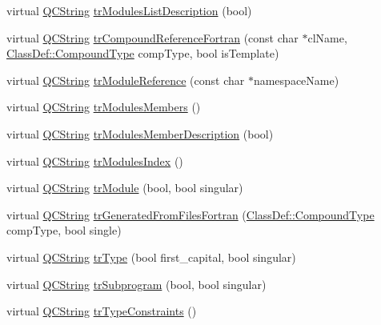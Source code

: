 \begin{DoxyCompactItemize}
virtual \mbox{\hyperlink{class_q_c_string}{Q\+C\+String}} \mbox{\hyperlink{class_translator_persian_af5c8699a8b0145943768b40867049c1d}{tr\+Modules\+List\+Description}} (bool)
\item 
virtual \mbox{\hyperlink{class_q_c_string}{Q\+C\+String}} \mbox{\hyperlink{class_translator_persian_a00ceb20bf1128a90d2e57f9cc3351181}{tr\+Compound\+Reference\+Fortran}} (const char $\ast$cl\+Name, \mbox{\hyperlink{class_class_def_ae70cf86d35fe954a94c566fbcfc87939}{Class\+Def\+::\+Compound\+Type}} comp\+Type, bool is\+Template)
\item 
virtual \mbox{\hyperlink{class_q_c_string}{Q\+C\+String}} \mbox{\hyperlink{class_translator_persian_ae74202e285172d8f1c8cabadc07a338a}{tr\+Module\+Reference}} (const char $\ast$namespace\+Name)
\item 
virtual \mbox{\hyperlink{class_q_c_string}{Q\+C\+String}} \mbox{\hyperlink{class_translator_persian_a77a9115ca4a5c9f88c4f08692a365fb9}{tr\+Modules\+Members}} ()
\item 
virtual \mbox{\hyperlink{class_q_c_string}{Q\+C\+String}} \mbox{\hyperlink{class_translator_persian_a7657ea35e8614f527f2fca992d09c321}{tr\+Modules\+Member\+Description}} (bool)
\item 
virtual \mbox{\hyperlink{class_q_c_string}{Q\+C\+String}} \mbox{\hyperlink{class_translator_persian_a01a3063763784bf67b21bad282c8a914}{tr\+Modules\+Index}} ()
\item 
virtual \mbox{\hyperlink{class_q_c_string}{Q\+C\+String}} \mbox{\hyperlink{class_translator_persian_aa2d31e99887be189d227e4c58af3bcae}{tr\+Module}} (bool, bool singular)
\item 
virtual \mbox{\hyperlink{class_q_c_string}{Q\+C\+String}} \mbox{\hyperlink{class_translator_persian_a8a2a0f314a7b73aafc6b6b56241bbb89}{tr\+Generated\+From\+Files\+Fortran}} (\mbox{\hyperlink{class_class_def_ae70cf86d35fe954a94c566fbcfc87939}{Class\+Def\+::\+Compound\+Type}} comp\+Type, bool single)
\item 
virtual \mbox{\hyperlink{class_q_c_string}{Q\+C\+String}} \mbox{\hyperlink{class_translator_persian_ac61885d4032e8e00d3d96037cccc7959}{tr\+Type}} (bool first\+\_\+capital, bool singular)
\item 
virtual \mbox{\hyperlink{class_q_c_string}{Q\+C\+String}} \mbox{\hyperlink{class_translator_persian_a22fb6406f917e03dcaf55e86853d51bc}{tr\+Subprogram}} (bool, bool singular)
\item 
virtual \mbox{\hyperlink{class_q_c_string}{Q\+C\+String}} \mbox{\hyperlink{class_translator_persian_ad49db74cbe27a29d473ac9bd126b04c0}{tr\+Type\+Constraints}} ()

\end{DoxyCompactItemize}
